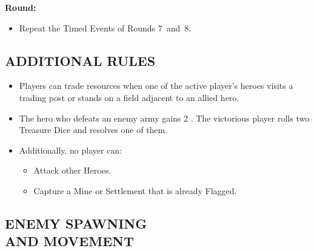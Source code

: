 \begin{multicols}{2}
\textbf{ Round:}
\begin{itemize}
  \item Repeat the Timed Events of Rounds \mbox{7 and 8.}
\end{itemize}
\vspace{-0.5em}

\subsection*{\MakeUppercase{Additional Rules}}

\begin{itemize}
  \item Players can trade resources when one of the active player's heroes visits a trading post or stands on a field adjacent to an allied hero.
  \item The hero who defeats an enemy army gains 2 .
    The victorious player rolls two Treasure Dice and resolves one of them.
  \item Additionally, no player can:
  \begin{itemize}
      \item Attack other Heroes.
      \item Capture a Mine or Settlement that is already Flagged.
  \end{itemize}
\end{itemize}

\subsection*{\MakeUppercase{Enemy Spawning\\and Movement}}


\end{multicols}
